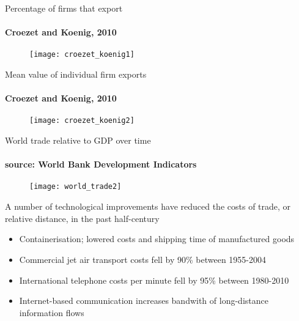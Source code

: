 \documentclass{beamer}
\begin{document}
\begin{frame}{Percentage of firms that export}
\framesubtitle{Croezet and Koenig, 2010}
  \begin{figure}\centering
    \texttt{[image: croezet\_koenig1]}
  \end{figure}  
\end{frame}
\begin{frame}{Mean value of individual firm exports}
\framesubtitle{Croezet and Koenig, 2010}
  \begin{figure}\centering
    \texttt{[image: croezet\_koenig2]}
  \end{figure}  
\end{frame}

\begin{frame}{World trade relative to GDP over time}
\framesubtitle{source: World Bank Development Indicators}
  \begin{figure}
    \texttt{[image: world\_trade2]}
  \end{figure}  
\end{frame}


\begin{frame}
  A number of technological improvements have reduced the costs of trade, or relative distance, in the past half-century
  \begin{itemize}
    \item Containerisation; lowered costs and shipping time of manufactured goods
    \item Commercial jet air transport costs fell by 90\% between 1955-2004
    \medskip
    \item International telephone costs per minute fell by 95\% between 1980-2010
    \item Internet-based communication increases bandwith of long-distance information flows    
  \end{itemize}
\end{frame}
\end{document}
